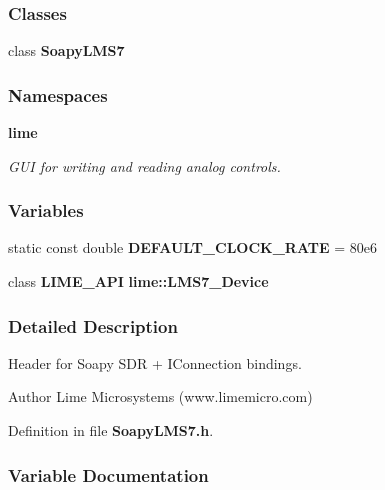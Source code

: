 \subsubsection*{Classes}
\begin{DoxyCompactItemize}
\item 
class {\bf Soapy\+L\+M\+S7}
\end{DoxyCompactItemize}
\subsubsection*{Namespaces}
\begin{DoxyCompactItemize}
\item 
 {\bf lime}
\begin{DoxyCompactList}\small\item\em G\+UI for writing and reading analog controls. \end{DoxyCompactList}\end{DoxyCompactItemize}
\subsubsection*{Variables}
\begin{DoxyCompactItemize}
\item 
static const double {\bf D\+E\+F\+A\+U\+L\+T\+\_\+\+C\+L\+O\+C\+K\+\_\+\+R\+A\+TE} = 80e6
\item 
class {\bf L\+I\+M\+E\+\_\+\+A\+PI} {\bf lime\+::\+L\+M\+S7\+\_\+\+Device}
\end{DoxyCompactItemize}


\subsubsection{Detailed Description}
Header for Soapy S\+DR + I\+Connection bindings. 

\begin{DoxyAuthor}{Author}
Lime Microsystems (www.\+limemicro.\+com) 
\end{DoxyAuthor}


Definition in file {\bf Soapy\+L\+M\+S7.\+h}.



\subsubsection{Variable Documentation}
